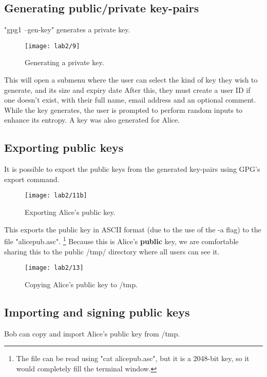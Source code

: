 \subsection{Generating public/private key-pairs}\label{subsec:generating-private-keys}

"gpg1 --gen-key" generates a private key.

\begin{figure}[H]
    \centering
    \texttt{[image: lab2/9]}
    \caption{Generating a private key.}
    \label{fig:GPGgen}
\end{figure}

This will open a submenu where the user can select the kind of key they wish to generate,
and its size and expiry date
After this, they must create a user ID if one doesn't exist, with their full name,
email address and an optional comment.
While the key generates, the user is prompted to perform random inputs to enhance its entropy.
A key was also generated for Alice.

\pagebreak

\subsection{Exporting public keys}\label{subsec:exporting-public-keys}
It is possible to export the public keys from the generated key-pairs using GPG's export command.

\begin{figure}[H]
    \centering
    \texttt{[image: lab2/11b]}
    \caption{Exporting Alice's public key.}
    \label{fig:GPGexport}
\end{figure}

\noindent This exports the public key in ASCII format (due to the use of the -a flag) to the file "alicepub.asc".
\footnote{The file can be read using "cat alicepub.asc", but it is a 2048-bit key, so it would completely fill the terminal window.}
Because this is Alice's \textbf{public} key, we are comfortable sharing this to the public /tmp/ directory where all
users can see it.

\begin{figure}[H]
    \centering
    \texttt{[image: lab2/13]}
    \caption{Copying Alice's public key to /tmp.}
    \label{fig:alicePubTmp}
\end{figure}


\subsection{Importing and signing public keys}\label{subsec:importing-public-keys}
Bob can copy and import Alice's public key from /tmp\@.

